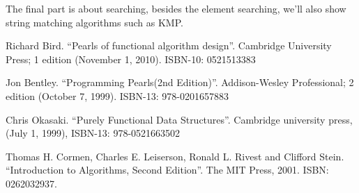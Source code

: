 \documentclass[b5paper]{article}
\begin{document}
The final part is about searching, besides the element
searching, we'll also show string matching algorithms
such as KMP.

\begin{thebibliography}{99}

Richard Bird. ``Pearls of functional algorithm design''. Cambridge University Press; 1 edition (November 1, 2010). ISBN-10: 0521513383

Jon Bentley. ``Programming Pearls(2nd Edition)''. Addison-Wesley Professional; 2 edition (October 7, 1999). ISBN-13: 978-0201657883

Chris Okasaki. ``Purely Functional Data Structures''. Cambridge university press, (July 1, 1999), ISBN-13: 978-0521663502

Thomas H. Cormen, Charles E. Leiserson, Ronald L. Rivest and Clifford Stein. ``Introduction to Algorithms, Second Edition''. The MIT Press, 2001. ISBN: 0262032937.

\end{thebibliography}

\ifx\wholebook\relax \else
\end{document}
